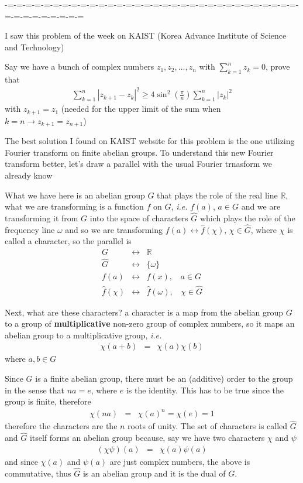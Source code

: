 \documentclass[aps,preprint,preprintnumbers,nofootinbib,showpacs,prd]{revtex4-1}
\newcommand{\ie}{{\it i.e.} }
\newcommand{\nbea}{\begin{eqnarray*}}
\newcommand{\neea}{\end{eqnarray*}}
\begin{document}
-=-=-=-=-=-=-=-=-=-=-=-=-=-=-=-=-=-=-=-=-=-=-=-=-=-=-=-=-=-=-=-=-=-=-=-=-=-=-=-=-=

I saw this problem of the week on KAIST (Korea Advance Institute of Science and Technology)

Say we have a bunch of complex numbers $z_1,z_2,\ldots,z_n$ with $\sum_{k=1}^n z_k = 0$, prove that
%
\nbea
\sum_{k=1}^{n} \left | z_{k+1} - z_k\right |^2 \ge 4\sin^2\left ( \frac{\pi}{n}\right ) \sum_{k=1}^n \left | z_k\right |^2
\neea
%
with $z_{k+1} = z_1$ (needed for the upper limit of the sum when $k = n \to z_{k+1} = z_{n+1}$)

The best solution I found on KAIST website for this problem is the one utilizing Fourier transform on finite abelian groups. To understand this new Fourier transform better, let's draw a parallel with the usual Fourier trnasform we already know

What we have here is an abelian group $G$ that plays the role of the real line $\mathbb{R}$, what we are transforming is a function $f$ on $G$, \ie $f(a)$, $a\in G$ and we are transforming it from $G$ into the space of characters $\widehat G$ which plays the role of the frequency line $\omega$ and so we are transforming $f(a) \leftrightarrow \hat f(\chi)$, $\chi \in \widehat G$, where $\chi$ is called a character, so the parallel is
%
\nbea
G &\longleftrightarrow& \mathbb{R} \\
\widehat G &\longleftrightarrow& \{\omega\} \\
f(a) &\longleftrightarrow& f(x), ~~~~ a\in G\\
\hat f(\chi) &\longleftrightarrow& \hat f(\omega), ~~~~ \chi \in \widehat G
\neea
%

Next, what are these characters? a character is a map from the abelian group $G$ to a group of {\bf multiplicative} non-zero group of complex numbers, so it maps an abelian group to a multiplicative group, \ie
%
\nbea
\chi(a+b) & = & \chi(a)\chi(b)
\neea
%
where $a,b \in G$

Since $G$ is a finite abelian group, there must be an (additive) order to the group in the sense that $na = e$, where $e$ is the identity. This has to be true since the group is finite, therefore
%
\nbea
\chi(na) &=& \chi(a)^n = \chi(e) = 1
\neea
%
therefore the characters are the $n$ roots of unity. The set of characters is called $\widehat G$ and $\widehat G$ itself forms an abelian group because, say we have two characters $\chi$ and $\psi$
%
\nbea
(\chi\psi)(a) & = & \chi(a)\psi(a)
\neea
%
and since $\chi(a)$ and $\psi(a)$ are just complex numbers, the above is commutative, thus $\widehat G$ is an abelian group and it is the dual of $G$.
\end{document}
